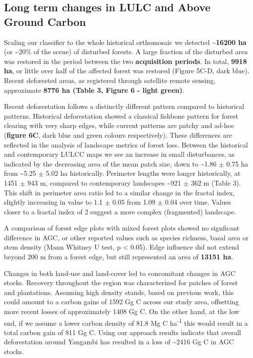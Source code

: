 \documentclass[remote sensing,article,submit,moreauthors,pdftex]{mdpi}
\begin{document}
\hypertarget{long-term-changes-in-lulc-and-above-ground-carbon}{%
\subsection{Long term changes in LULC and Above Ground
Carbon}\label{long-term-changes-in-lulc-and-above-ground-carbon}}

Scaling our classifier to the whole historical orthomosaic we detected
\textbf{\textasciitilde{}16200 ha} (or \textasciitilde{}20\% of the
scene) of disturbed forests. A large fraction of the disturbed area was
restored in the period between the two \textbf{acquisition periods}. In
total, \textbf{9918 ha}, or little over half of the affected forest was
restored (Figure 5C-D, dark blue). Recent deforested areas, as
registered through satellite remote sensing, approximate \textbf{8776 ha
(Table 3, Figure 6 - light green)}.

Recent deforestation follows a distinctly different pattern compared to
historical patterns. Historical deforestation showed a classical
fishbone pattern for forest clearing with very sharp edges, while
current patterns are patchy and ad-hoc (\textbf{figure 6C}, dark blue
and green colours respectively). These differences are reflected in the
analysis of landscape metrics of forest loss. Between the historical and
contemporary LULCC maps we see an increase in small disturbances, as
indicated by the decreasing area of the mean patch size, down to
\textasciitilde{}1.86 \(\pm\) 0.75 ha from \textasciitilde{}5.25 \(\pm\)
5.02 ha historically. Perimeter lengths were longer historically, at
1451 \(\pm\) 943 m, compared to contemporary landscapes
\textasciitilde{}921 \(\pm\) 362 m (Table 3). This shift in perimeter
area ratio led to a similar change in the fractal index, slightly
increasing in value to 1.1 \(\pm\) 0.05 from 1.09 \(\pm\) 0.04 over
time. Values closer to a fractal index of 2 suggest a more complex
(fragmented) landscape.

A comparison of forest edge plots with mixed forest plots showed no
signficant difference in AGC, or other reported values such as species
richness, basal area or stem density (Mann Whitney U test, p \textless{}
0.05). Edge influence did not extend beyond 200 m from a forest edge,
but still represented an area of \textbf{13151 ha}.

Changes in both land-use and land-cover led to concomitant changes in
AGC stocks. Recovery throughout the region was characterized for patches
of forest and plantations. Assuming high density stands, based on
previous work, this could amount to a carbon gains of 1592 Gg C across
our study area, offsetting more recent losses of approximately 1408 Gg
C. On the other hand, at the low end, if we assume a lower carbon
density of 81.8 Mg C ha\textsuperscript{-1} this would result in a total
carbon gain of 811 Gg C. Using our approach results indicate that
overall deforestation around Yangambi has resulted in a loss of
\textasciitilde{}2416 Gg C in AGC stocks.
\end{document}
